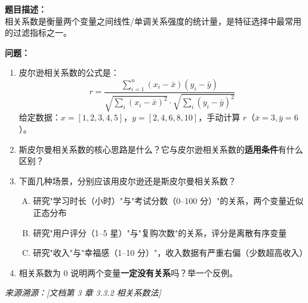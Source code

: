 \documentclass[a4paper,11pt]{ctexart}
\begin{document}
\begin{problembox}
    \textbf{题目描述：}\\
    相关系数是衡量两个变量之间线性/单调关系强度的统计量，是特征选择中最常用的过滤指标之一。

    \vspace{0.2cm}
    \textbf{问题：}
    \begin{enumerate}[(1)]
        \item 皮尔逊相关系数的公式是：
        \[
        r = \frac{\sum_{i=1}^n (x_i - \bar{x})(y_i - \bar{y})}{\sqrt{\sum_i(x_i-\bar{x})^2} \cdot \sqrt{\sum_i(y_i-\bar{y})^2}}
        \]
        给定数据：$x = [1, 2, 3, 4, 5]$，$y = [2, 4, 6, 8, 10]$，手动计算 $r$（$\bar{x}=3, \bar{y}=6$）。

        \item 斯皮尔曼相关系数的核心思路是什么？它与皮尔逊相关系数的\textbf{适用条件}有什么区别？

        \item 下面几种场景，分别应该用皮尔逊还是斯皮尔曼相关系数？
        \begin{enumerate}[A.]
            \item 研究"学习时长（小时）"与"考试分数（0--100 分）"的关系，两个变量近似正态分布
            \item 研究"用户评分（1--5 星）"与"复购次数"的关系，评分是离散有序变量
            \item 研究"收入"与"幸福感（1--10 分）"，收入数据有严重右偏（少数超高收入）
        \end{enumerate}
        \item 相关系数为 0 说明两个变量\textbf{一定没有关系}吗？举一个反例。
    \end{enumerate}
    {\color{gray}\small\textit{来源溯源：[文档第 3 章 3.3.2 相关系数法]}}
\end{problembox}
\end{document}
